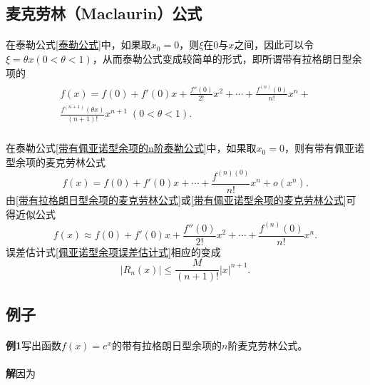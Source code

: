 \subsection{麦克劳林（Maclaurin）公式}
\paragraph{}
在泰勒公式\eqref{泰勒公式}中，如果取$x_0 = 0$，则$\xi$在$0$与$x$之间，因此可以令$\xi=\theta x(0<\theta<1)$，从而泰勒公式变成较简单的形式，即所谓带有拉格朗日型余项的
\begin{align}
\begin{split}
  \label{带有拉格朗日型余项的麦克劳林公式}
  f(x) = f(0) + f'(0)x+\frac{f''(0)}{2!}x^2 + \cdots + \frac{f^{(n)}(0)}{n!}x^n + \\
  \frac{f^{(n+1)}(\theta x)}{(n+1)!}x^{n+1} \; (0 < \theta < 1).
\end{split}
\end{align}

\paragraph{}
在泰勒公式\eqref{带有佩亚诺型余项的n阶泰勒公式}中，如果取$x_0 = 0$，则有带有佩亚诺型余项的麦克劳林公式
\begin{equation}
  \label{带有佩亚诺型余项的麦克劳林公式}
  f(x) = f(0) + f'(0)x + \cdots + \frac{f^{(n)(0)}}{n!}x^n + o(x^n).
\end{equation}
由\eqref{带有拉格朗日型余项的麦克劳林公式}或\eqref{带有佩亚诺型余项的麦克劳林公式}可得近似公式
\begin{equation}
  f(x) \approx f(0) + f'(0)x + \frac{f''(0)}{2!}x^2 + \cdots + \frac{f^{(n)}(0)}{n!}x^n.
\end{equation}
误差估计式\eqref{佩亚诺型余项误差估计式}相应的变成
\begin{equation}
  |R_n(x)| \leq \frac{M}{(n+1)!}|x|^{n+1}.
\end{equation}

\subsection{例子}
\paragraph{}
\textbf{例1\;}写出函数$f(x)=e^x$的带有拉格朗日型余项的$n$阶麦克劳林公式。

\paragraph{}
\textbf{解\;}因为

